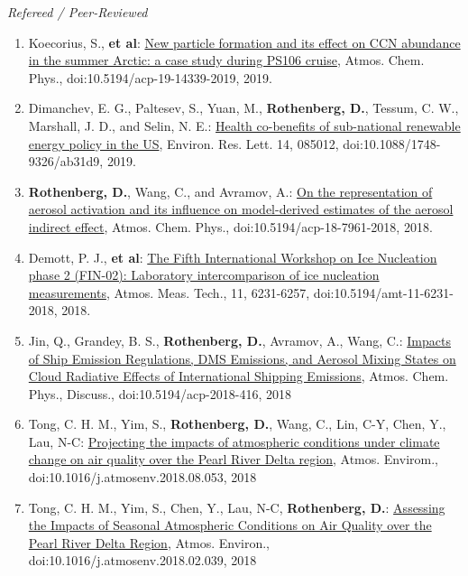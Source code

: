 \documentclass[11pt,letterpaper]{article}
\begin{document}
 \bigskip
 \emph{Refereed / Peer-Reviewed}
 \medskip
 \begin{enumerate}[itemindent=-10pt]

\item Koecorius, S., \textbf{et al}: \href{https://doi.org/10.5194/acp-19-14339-2019}{New particle formation and its effect on CCN abundance in the summer Arctic: a case study during PS106 cruise}, Atmos. Chem. Phys., doi:10.5194/acp-19-14339-2019, 2019.

 \item Dimanchev, E. G., Paltesev, S., Yuan, M., \textbf{Rothenberg, D.}, Tessum, C. W., Marshall, J. D., and Selin, N. E.: \href{https://doi.org/10.1088/1748-9326/ab31d9}{Health co-benefits of sub-national renewable energy policy in the US}, Environ. Res. Lett. 14, 085012, doi:10.1088/1748-9326/ab31d9, 2019.

 \item \textbf{Rothenberg, D.}, Wang, C., and Avramov, A.: \href{http://doi.org/10.5194/acp-18-7961-2018}{On the representation of aerosol activation and its influence on model-derived estimates of the aerosol indirect effect}, Atmos. Chem. Phys., doi:10.5194/acp-18-7961-2018, 2018.

 \item Demott, P. J., \textbf{et al}: \href{https://doi.org/10.5194/amt-11-6231-2018}{The Fifth International Workshop on Ice Nucleation phase 2 (FIN-02): Laboratory intercomparison of ice nucleation measurements}, Atmos. Meas. Tech., 11, 6231-6257, doi:10.5194/amt-11-6231-2018, 2018.

 \item Jin, Q., Grandey, B. S., \textbf{Rothenberg, D.}, Avramov, A., Wang, C.: \href{https://doi.org/10.5194/acp-2018-416}{Impacts of Ship Emission Regulations, DMS Emissions, and Aerosol Mixing States on Cloud Radiative Effects of International Shipping Emissions}, Atmos. Chem. Phys., Discuss., doi:10.5194/acp-2018-416, 2018

 \item Tong, C. H. M., Yim, S., \textbf{Rothenberg, D.}, Wang, C., Lin, C-Y, Chen, Y., Lau, N-C: \href{https://doi.org/10.1016/j.atmosenv.2018.08.053}{Projecting the impacts of atmospheric conditions under climate change on air quality over the Pearl River Delta region}, Atmos. Envirom., doi:10.1016/j.atmosenv.2018.08.053, 2018

 \item Tong, C. H. M., Yim, S., Chen, Y., Lau, N-C, \textbf{Rothenberg, D.}: \href{https://doi.org/10.1016/j.atmosenv.2018.02.039}{Assessing the Impacts of Seasonal Atmospheric Conditions on Air Quality over the Pearl River Delta Region}, Atmos. Environ., doi:10.1016/j.atmosenv.2018.02.039, 2018


\end{enumerate}
\end{document}
